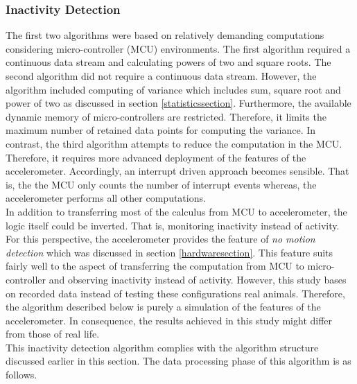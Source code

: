 \documentclass[english,12pt,a4paper,pdftex,elec,utf8]{aaltothesis}
\begin{document}
\subsubsection{Inactivity Detection} \label{inactivitydetectionsection}

The first two algorithms were based on relatively demanding computations considering micro-controller (MCU) environments. The first algorithm required a continuous data stream and calculating powers of two and square roots. The second algorithm did not require a continuous data stream. However, the algorithm included computing of variance which includes sum, square root and power of two as discussed in section \ref{statisticssection}. Furthermore, the available dynamic memory of micro-controllers are restricted. Therefore, it limits the maximum number of retained data points for computing the variance. In contrast, the third algorithm attempts to reduce the computation in the MCU. Therefore, it requires more advanced deployment of the features of the accelerometer. Accordingly, an interrupt driven approach becomes sensible. That is, the the MCU only counts the number of interrupt events whereas, the accelerometer performs all other computations. \\

In addition to transferring most of the calculus from MCU to accelerometer, the logic itself could be inverted. That is, monitoring inactivity instead of activity. For this perspective, the accelerometer provides the feature of \textit{no motion detection} which was discussed in section \ref{hardwaresection}. This feature suits fairly well to the aspect of transferring the computation from MCU to micro-controller and observing inactivity instead of activity. However, this study bases on recorded data instead of testing these configurations real animals. Therefore, the algorithm described below is purely a simulation of the features of the accelerometer. In consequence, the results achieved in this study might differ from those of real life. \\

This inactivity detection algorithm complies with the algorithm structure discussed earlier in this section. The data processing phase of this algorithm is as follows. \\
\end{document}
